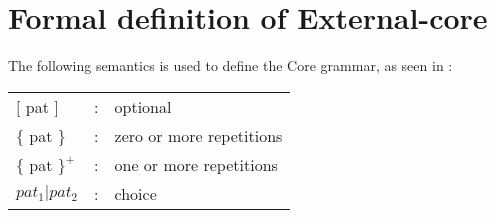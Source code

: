 
\section{Formal definition of External-core}
\label{coregrammar}

The following semantics is used to define the Core grammar, 
as seen in \cite{tolmach2010ghc}:

\begin{longtable}{ l c l }

$[$ pat $]$		& :	& optional			\\
$\{$ pat $\}$		& :	& zero or more repetitions	\\
$\{$ pat $\}^{+}$	& :	& one or more repetitions	\\
$pat_{1}|pat_{2}$	& :	& choice			\\

\end{longtable}

